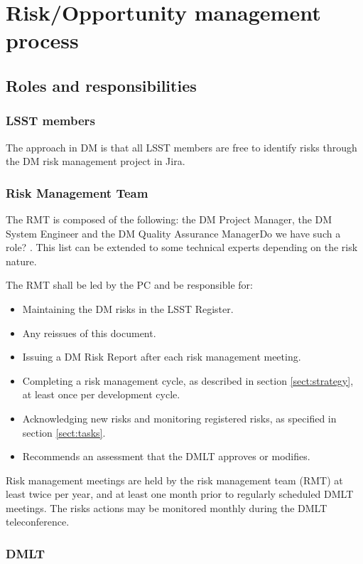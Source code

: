 \section{Risk/Opportunity  management process \label{sect:strategy} }

\subsection{Roles and responsibilities  \label{sect:org} }

\subsubsection{LSST members}
The approach in DM is  that all LSST  members are free to identify risks through the DM risk management project in Jira.


\subsubsection{Risk Management Team}

The RMT is composed of the following: the DM Project Manager, the DM System Engineer and the DM Quality Assurance Manager{\color{red}Do we have such a role?}  . This list can be extended to some technical experts depending on the risk nature.

The RMT shall be led by the PC and be responsible for:
\begin{itemize}
\item Maintaining the DM risks in the LSST Register.
\item Any reissues of this document.
\item Issuing a DM Risk Report after each risk management meeting.
\item Completing a risk management cycle, as described in section \ref{sect:strategy}, at least once per development cycle.
\item Acknowledging new risks and monitoring registered risks, as specified in section \ref{sect:tasks}.
\item Recommends an assessment that the DMLT approves or modifies.
\end{itemize}
Risk management meetings are held by the risk management team (RMT) at least twice per year, and at least one month prior to regularly scheduled DMLT meetings. The risks actions may be  monitored monthly during the DMLT teleconference.

\subsubsection{DMLT}

